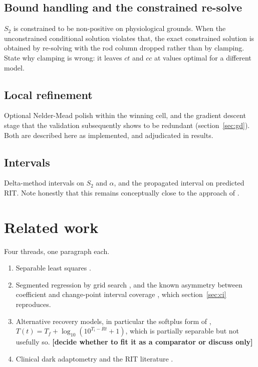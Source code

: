 \documentclass[11pt,a4paper]{article}
\newcommand{\FILL}[1]{\textbf{\textcolor{coneC}{[#1]}}}
\newcommand{\Sii}{S_2}
\begin{document}
\subsection{Bound handling and the constrained re-solve}
\begin{towrite}
$\Sii$ is constrained to be non-positive on physiological grounds. When the
unconstrained conditional solution violates that, the exact constrained
solution is obtained by re-solving with the rod column dropped rather than
by clamping. State why clamping is wrong: it leaves $ct$ and $cc$ at values
optimal for a different model.
\end{towrite}

\subsection{Local refinement}
\begin{towrite}
Optional Nelder-Mead polish within the winning cell, and the gradient
descent stage that the validation subsequently shows to be redundant
(section~\ref{sec:gd}). Both are described here as implemented, and
adjudicated in results.
\end{towrite}

\subsection{Intervals}
\begin{towrite}
Delta-method intervals on $\Sii$ and $\alpha$, and the propagated interval
on predicted RIT. Note honestly that this remains conceptually close to the
approach of \citet{Kelly:2020aa}.
\end{towrite}

\section{Related work}
\begin{towrite}
Four threads, one paragraph each.
\begin{enumerate}[nosep]
\item Separable least squares \citep{Golub:1973aa,Golub:2003aa}.
\item Segmented regression by grid search
  \citep{Hudson:1966aa,Lerman:1980aa}, and the known asymmetry between
  coefficient and change-point interval coverage \citep{Kim:2008aa}, which
  section~\ref{sec:ci} reproduces.
\item Alternative recovery models, in particular the softplus form of
  \citet{Dimitrov:2008aa}, $T(t) = T_f + \log_{10}(10^{T_i - Rt} + 1)$,
  which is partially separable but not usefully so. \FILL{decide whether to
  fit it as a comparator or discuss only}
\item Clinical dark adaptometry and the RIT literature
  \citep{Jackson:2008aa,Jackson:2014aa,Owsley:2016aa,DeSilva:2019aa,Higgins:2018aa}.
\end{enumerate}
\end{towrite}
\end{document}
